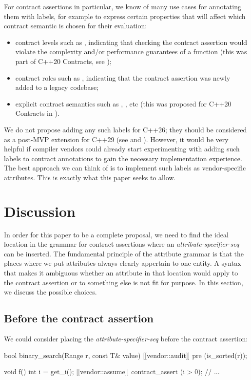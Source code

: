For contract assertions in particular, we know of many use cases for annotating them with labels, for example to express certain properties that will affect which contract semantic is chosen for their evaluation:
\begin{itemize}
\item contract levels such as , indicating that checking the contract assertion would violate the complexity and/or performance guarantees of a function (this was part of C++20 Contracts, see \cite{P0542R5});
\item contract roles such as , indicating that the contract assertion was newly added to a legacy codebase;
\item explicit contract semantics such as , , etc (this was proposed for C++20 Contracts in \cite{P1429R3}).
\end{itemize}

We do not propose adding any such labels for C++26; they should be considered as a post-MVP extension for C++29 (see \cite{P2755R0} and \cite{P2885R3}). However, it would be very helpful if compiler vendors could already start experimenting with adding such labels to contract annotations to gain the necessary implementation experience. The best approach we can think of is to implement such labels as vendor-specific attributes. This is exactly what this paper seeks to allow.

\section{Discussion}

In order for this paper to be a complete proposal, we need to find the ideal location in the grammar for contract assertions where an \emph{attribute-specifier-seq} can be inserted. The fundamental principle of the attribute grammar is that the places where we put attributes always clearly appertain to one entity. A syntax that makes it ambiguous whether an attribute in that location would apply to the contract  assertion or to something else is not fit for purpose. In this section, we discuss the possible choices.

\subsection{Before the contract assertion}

We could consider placing the \emph{attribute-specifier-seq} before the contract assertion:
\begin{codeblock}
bool binary_search(Range r, const T& value)
  [[vendor::audit]] pre (is_sorted(r));
  
void f() {
  int i = get_i();
  [[vendor::assume]] contract_assert (i > 0);
  // ...
}
\end{codeblock}

